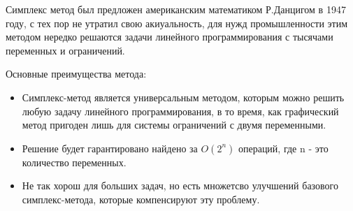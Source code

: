 \documentclass[../body.tex]{subfiles}
\begin{document}
		
	Симплекс метод был предложен американским математиком Р.Данцигом в 1947 году, с тех пор не утратил свою акиуальность, для нужд промышленности этим методом нередко решаются задачи линейного программирования с тысячами переменных и ограничений. \\
	\vspace{\baselineskip}
	
	Основные преимущества метода:
	\begin{itemize}
		\item Симплекс-метод является универсальным методом, которым можно решить любую задачу линейного программирования, в то время, как графический метод пригоден лишь для системы ограничений с двумя переменными.
		\item Решение будет гарантировано найдено за $O(2^n)$ операций, где n - это количество переменных.
		\item Не так хорош для больших задач, но есть множетсво улучшений базового симплекс-метода, которые компенсируют эту проблему.
	\end{itemize}
	
	
\end{document}
